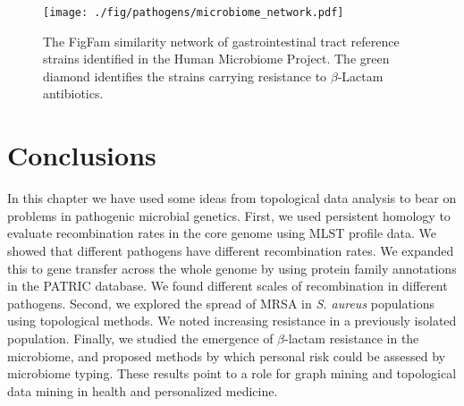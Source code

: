 \begin{figure}[t]
\centering
\texttt{[image: ./fig/pathogens/microbiome\_network.pdf]}
\caption[FigFam similarity network of the gastrointestinal tract]{The FigFam similarity network of gastrointestinal tract reference strains identified in the Human Microbiome Project. The green diamond identifies the strains carrying resistance to $\beta$-Lactam antibiotics.}
\label{fig:microbiome_network}
\end{figure}

\section{Conclusions}

In this chapter we have used some ideas from topological data analysis to bear on problems in pathogenic microbial genetics.
First, we used persistent homology to evaluate recombination rates in the core genome using MLST profile data.
We showed that different pathogens have different recombination rates.
We expanded this to gene transfer across the whole genome by using protein family annotations in the PATRIC database.
We found different scales of recombination in different pathogens.
Second, we explored the spread of MRSA in \emph{S. aureus} populations using topological methods.
We noted increasing resistance in a previously isolated population.
Finally, we studied the emergence of $\beta$-lactam resistance in the microbiome, and proposed methods by which personal risk could be assessed by microbiome typing.
These results point to a role for graph mining and topological data mining in health and personalized medicine.